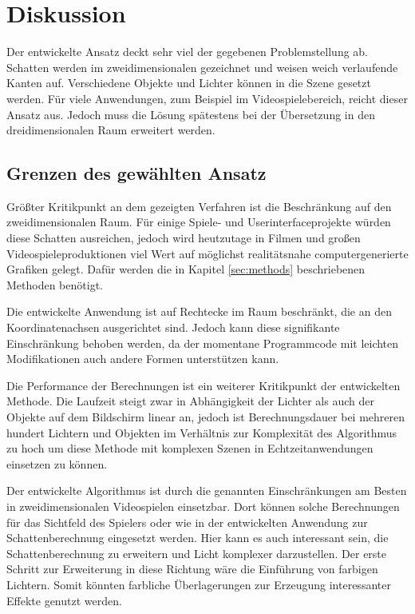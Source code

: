 \section{Diskussion}

Der entwickelte Ansatz deckt sehr viel der gegebenen Problemstellung ab. Schatten werden im zweidimensionalen gezeichnet
und weisen weich verlaufende Kanten auf. Verschiedene Objekte und Lichter können in die Szene gesetzt
werden. Für viele Anwendungen, zum Beispiel im Videospielebereich, reicht dieser Ansatz aus. Jedoch
muss die Lösung spätestens bei der Übersetzung in den dreidimensionalen Raum erweitert werden.

\subsection{Grenzen des gewählten Ansatz}

Größter Kritikpunkt an dem gezeigten Verfahren ist die Beschränkung auf den zweidimensionalen Raum.
Für einige Spiele- und Userinterfaceprojekte würden diese Schatten ausreichen, jedoch wird heutzutage in Filmen und großen Videospieleproduktionen
viel Wert auf möglichst realitätsnahe computergenerierte Grafiken
gelegt. Dafür werden die in Kapitel \ref{sec:methods} beschriebenen Methoden benötigt.

Die entwickelte Anwendung ist auf Rechtecke im Raum beschränkt, die an den Koordinatenachsen
ausgerichtet sind. Jedoch kann diese signifikante Einschränkung behoben werden, da der
momentane Programmcode mit leichten Modifikationen auch andere Formen unterstützen kann.

Die Performance der Berechnungen ist ein weiterer Kritikpunkt der entwickelten Methode. Die Laufzeit
steigt zwar in Abhängigkeit der Lichter als auch der Objekte auf dem Bildschirm linear an, jedoch
ist Berechnungsdauer bei mehreren hundert Lichtern und Objekten im Verhältnis zur Komplexität des
Algorithmus zu hoch um diese Methode mit komplexen Szenen in Echtzeitanwendungen einsetzen zu können.

Der entwickelte Algorithmus ist durch die genannten Einschränkungen am Besten in zweidimensionalen
Videospielen einsetzbar. Dort können solche Berechnungen für das Sichtfeld des Spielers oder wie in
der entwickelten Anwendung zur Schattenberechnung eingesetzt werden. Hier kann es auch interessant
sein, die Schattenberechnung zu erweitern und Licht komplexer darzustellen. Der erste Schritt zur
Erweiterung in diese Richtung wäre die Einführung von farbigen Lichtern. Somit könnten farbliche
Überlagerungen zur Erzeugung interessanter Effekte genutzt werden.

